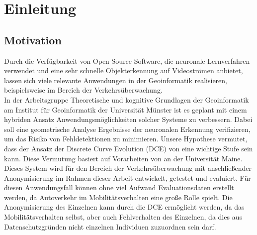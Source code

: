\chapter{Einleitung}
\label{ch:intro}

\section{Motivation}{ 
	
Durch die Verfügbarkeit von Open-Source Software, die neuronale Lernverfahren verwendet und eine sehr schnelle Objekterkennung auf Videoströmen anbietet, lassen sich viele relevante Anwendungen in der Geoinformatik realisieren, beispielsweise im Bereich der Verkehrsüberwachung. \\
In der Arbeitsgruppe \glqq Theoretische und kognitive Grundlagen der Geoinformatik \grqq{} am Institut für Geoinformatik der Universität Münster ist es geplant mit einem hybriden Ansatz Anwendungsmöglichkeiten solcher Systeme zu verbessern. Dabei soll eine geometrische Analyse Ergebnisse der neuronalen Erkennung verifizieren, um das Risiko von Fehldetektionen zu minimieren. Unsere Hypothese vermutet, dass der Ansatz der Discrete Curve Evolution (DCE) von \citet{Latecki1999a}  eine wichtige Stufe sein kann. Diese Vermutung basiert auf Vorarbeiten von \citet*{Dorr2015} an der Universität Maine.\\

Dieses System wird für den Bereich der Verkehrsüberwachung mit anschließender Anonymisierung im Rahmen dieser Arbeit entwickelt, getestet und evaluiert. Für diesen Anwendungsfall können ohne viel Aufwand Evaluationsdaten erstellt werden, da Autoverkehr im Mobilitätsverhalten eine große Rolle spielt. Die Anonymisierung des Einzelnen kann durch die DCE ermöglicht werden, da das Mobilitätsverhalten selbst, aber auch Fehlverhalten des Einzelnen, da dies aus Datenschutzgründen nicht einzelnen Individuen zuzuordnen sein darf.
}



